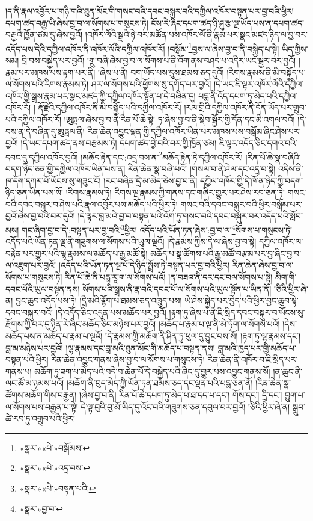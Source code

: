 །ད་ནི་རྣལ་འབྱོར་པ་གཉི་གའི་ཐུན་མོང་གི་གསང་བའི་དབང་བསྐུར་བའི་དཀྱིལ་འཁོར་བསྟན་པར་བྱ་བའི་ཕྱིར། དཔག་ཚད་བརྒྱ་ཡི་ཞེས་བྱ་བ་ལ་སོགས་པ་གསུངས་ཏེ། ངོས་རེ་ཞིང་དཔག་ཚད་ཉི་ཤུ་རྩ་ལྔ་ཡོད་པས་ན་དཔག་ཚད་བརྒྱའི་ཁྱོན་ཙམ་དུ་ཞེས་བྱའོ། །འཁོར་ལོའི་སྒྲའི་ཉེ་བར་མཚོན་པས་འཁོར་ལོ་ནི་རྣམ་པར་སྣང་མཛད་ཉིད་ལ་བྱ་བར་འདོད་པས་དེའི་དཀྱིལ་འཁོར་ནི་འཁོར་ལོའི་དཀྱིལ་འཁོར་རོ། །བསྒོམ་\footnote{«སྣར་»«པེ་»བསྒོམས་}བྱས་ལ་ཞེས་བྱ་བ་ནི་བསྐྱེད་པ་སྟེ། ཡིད་ཀྱིས་སམ། བྲི་བས་བསྐྱེད་པར་བྱའོ། །གྲུ་བཞི་ཞེས་བྱ་བ་ལ་སོགས་པ་ནི་འོག་ནས་བཤད་པ་འདིར་ཡང་སྦྱར་བར་བྱའོ། །རྣམ་པར་མཁས་པས་རྟག་པར་ནི། །ཞེས་པ་ནི། བག་ཡོད་པས་དུས་ཐམས་ཅད་དུའོ། །རིགས་རྣམས་ནི་མི་བསྐྱོད་པ་ལ་སོགས་པའི་རིགས་རྣམས་ཏེ། ཤར་ལ་སོགས་པའི་ཕྱོགས་སུ་དགོད་པར་བྱའོ། །དེ་ཡང་ཇི་ལྟར་འཁོར་ལོའི་དཀྱིལ་འཁོར་གྱི་སྒྲས་རྣམ་པར་སྣང་མཛད་ཀྱི་དཀྱིལ་འཁོར་སྟོན་པ་དེ་བཞིན་དུ། པདྨ་ནི་འོད་དཔག་ཏུ་མེད་པའི་དཀྱིལ་འཁོར་རོ། །
རྡོ་རྗེའི་དཀྱིལ་འཁོར་ནི་མི་བསྐྱོད་པའི་དཀྱིལ་འཁོར་རོ། །རལ་གྲིའི་དཀྱིལ་འཁོར་ནི་དོན་ཡོད་པར་གྲུབ་པའི་དཀྱིལ་འཁོར་རོ། །ཨུཏྤལ་ཞེས་བྱ་བ་ནི་རིན་པོ་ཆེ་སྟེ། ཏ་ཞེས་བྱ་བ་ནི་སྡེབ་སྦྱོར་གྱི་དོན་དང་མི་འགལ་བའོ། །དེ་བས་ན་དེ་བཞིན་དུ་ཨུཏྤལ་ནི། རིན་ཆེན་འབྱུང་ལྡན་གྱི་དཀྱིལ་འཁོར་ཡིན་པར་མཁས་པས་བསྒོམ་ཞིང་ཤེས་པར་བྱའོ། །དེ་ཡང་དཔག་ཚད་ནས་བརྩམས་ཏེ། དཔག་ཚད་བྱེ་བའི་བར་གྱི་ཁྱོན་ཙམ། ཇི་ལྟར་འདོད་ཅིང་དགའ་བའི་དབང་དུ་དཀྱིལ་འཁོར་བྱའོ། །མཆོད་རྟེན་དང་:འདྲ་བས་ན་\footnote{«སྣར་»«པེ་»འདྲ་བས་}མཆོད་རྟེན་ཏེ་དཀྱིལ་འཁོར་རོ། །རིན་པོ་ཆེ་སྣ་བཞིའི་བདག་ཉིད་ཅན་གྱི་དཀྱིལ་འཁོར་ཡིན་པས་ན། རིན་ཆེན་སྣ་བཞི་པའོ། །གསལ་བ་ནི་ཤེལ་དང་འདྲ་བ་སྟེ། འདིས་ནི་ཁ་དོག་དཀར་པོ་ཡོངས་སུ་གཟུང་ངོ། །རང་བཞིན་དྲི་མ་མེད་ཅེས་བྱ་བ་ནི། དཀྱིལ་འཁོར་གྱི་དེ་ཁོ་ན་ཉིད་ཀྱི་བདག་ཉིད་ཅན་ཡིན་པས་སོ། །རིགས་རྣམས་ཏེ། རིགས་ལྔ་རྣམས་ཀྱི་གནས་དང་གཞིར་གྱུར་པར་ཤེས་རབ་ཅན་ཏེ། གསང་བའི་དབང་བསྐུར་བ་ཤེས་པའི་རྣལ་འབྱོར་པས་མཆོད་པའི་ཕྱིར་ཏེ། གསང་བའི་དབང་བསྐུར་བའི་ཕྱིར་བསྒོམ་པར་བྱའོ་ཞེས་བྱ་བའི་བར་དུའོ། །དེ་ལྟར་བླ་མའི་བྱ་བ་བསྟན་པའི་འོག་ཏུ་གསང་བའི་དབང་བསྐུར་བར་འདོད་པའི་སློབ་མས། གང་ཞིག་བྱ་བ་དེ་:བསྟན་པར་བྱ་བའི་\footnote{«སྣར་»«པེ་»བསྟན་པའི་}ཕྱིར། འདོད་པའི་ཡོན་ཏན་ཞེས་:བྱ་བ་ལ་\footnote{«སྣར་»བྱ་བ་}སོགས་པ་གསུངས་ཏེ། འདོད་པའི་ཡོན་ཏན་ལྔ་ནི་གཟུགས་ལ་སོགས་པའི་ཡུལ་ལྔའོ། །དེ་རྣམས་ཀྱིས་དེ་ལ་ཞེས་བྱ་བ་སྟེ། དཀྱིལ་འཁོར་ལ་བརྟེན་པར་གྱུར་པའི་ལྷ་རྣམས་ལ་མཆོད་པ་རྒྱ་མཚོ་སྟེ། མཆོད་པ་སྣ་ཚོགས་པའི་རྒྱ་མཚོ་བརྩམ་པར་བྱ་ཞིང་བྱ་བ་ལ་འཇུག་པར་བྱའོ། །འདོད་པའི་ཡོན་ཏན་ལྔ་པོ་དེ་ཉིད་སྤྲོས་ཏེ་བསྟན་པར་བྱ་བའི་ཕྱིར། རིན་ཆེན་ཞེས་བྱ་བ་ལ་སོགས་པ་གསུངས་ཏེ། རིན་པོ་ཆེ་ནི་པདྨ་རཱ་ག་ལ་སོགས་པའོ། །ན་བཟའ་ནི་དར་དང་བལ་སོགས་པ་སྟེ། མིག་གི་དབང་པོའི་ཡུལ་བསྟན་ནས། སོགས་པའི་སྒྲས་ནི་རྣ་བའི་དབང་པོ་ལ་སོགས་པའི་ཡུལ་སྟོན་པ་ཡིན་ནོ། །ཅིའི་ཕྱིར་ཞེ་ན། བྱང་ཆུབ་འདོད་པས་ཏེ། །དྲི་མའི་རྙོག་པ་ཐམས་ཅད་འཁྲུད་པས། ཡེ་ཤེས་སྐྱེད་པར་བྱེད་པའི་ཕྱིར་བྱང་ཆུབ་སྟེ་དབང་བསྐུར་བའོ། །དེ་འདོད་ཅིང་འདུན་པས་མཆོད་པར་བྱའོ། །རྟག་ཏུ་ཞེས་པ་ནི་ཇི་སྲིད་དབང་བསྐུར་བ་ཡོངས་སུ་རྫོགས་ཀྱི་བར་དུ་ཉིན་རེ་ཞིང་མཆོད་ཅིང་མཉེས་པར་བྱའོ། །མཆོད་པ་རྣམ་པ་ལྔ་ནི་མེ་ཏོག་ལ་སོགས་པའོ། །དེས་མཆོད་པས་ན་མཆོད་པ་རྣམ་པ་ལྔའོ། །དེ་རྣམས་ཀྱི་མཆོག་ནི་ཤིན་ཏུ་ཕུལ་དུ་བྱུང་བས་སོ། །རྟག་ཏུ་ལྷ་རྣམས་དང་། བླ་མ་མཉེས་པར་བྱའོ། །ལྷ་རྣམས་དང་བླ་མའི་ཐུན་མོང་གི་མཆོད་པ་བསྟན་ནས། བླ་མའི་ཁྱད་པར་གྱི་མཆོད་པ་བསྟན་པའི་ཕྱིར། རིན་ཆེན་འབྱུང་གནས་ཞེས་བྱ་བ་ལ་སོགས་པ་གསུངས་ཏེ། རིན་ཆེན་ནི་འཁོར་བ་ཇི་སྲིད་པར་གནས་པ། མཆོག་ཏུ་ཟག་པ་མེད་པའི་བདེ་བ་ཆེན་པོ་དེ་བསྐྱེད་པའི་ཞིང་དུ་གྱུར་པས་འབྱུང་གནས་སོ། །ན་ཆུང་ནི་ལང་ཚོ་མ་ཉམས་པའོ། །མཆོག་ནི་བུད་མེད་ཀྱི་ཡོན་ཏན་ཐམས་ཅད་དང་ལྡན་པའི་པདྨ་ཅན་ནོ། །རིན་ཆེན་སྣ་ཚོགས་མཆོག་གིས་བརྒྱན། །ཞེས་བྱ་བ་ནི། རིན་པོ་ཆེ་དཔག་ཏུ་མེད་པ་ཐ་དད་པ་དང་། གོས་དང་། དྲི་དང་། བྱུག་པ་ལ་སོགས་པས་བརྒྱན་པ་སྟེ། དེ་ལྟ་བུའི་བུ་མོ་ཡིད་དུ་འོང་བའི་གཟུགས་ཅན་དབུལ་བར་བྱའོ། །ཅིའི་ཕྱིར་ཞེ་ན། སྒྲུབ་ཚེ་རབ་ཏུ་འགྲུབ་པའི་ཕྱིར། 